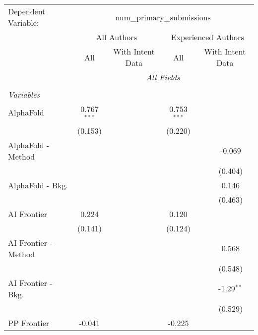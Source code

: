 \begingroup
\centering
\begin{tabular}{lcccccc}
   \tabularnewline \midrule \midrule
   Dependent Variable: & \multicolumn{6}{c}{num\_primary\_submissions}\\
 & \multicolumn{3}{c}{All Authors} & \multicolumn{3}{c}{Experienced Authors} \\
\cmidrule(lr){2-4} \cmidrule(lr){5-7}
 & \multicolumn{1}{c}{All} & \multicolumn{2}{c}{With Intent Data} & \multicolumn{1}{c}{All} & \multicolumn{2}{c}{With Intent Data} \\
\cmidrule(lr){2-2} \cmidrule(lr){3-4} \cmidrule(lr){5-5} \cmidrule(lr){6-7}
 & \multicolumn{6}{c}{\textit{All Fields}} \\ \\
   \emph{Variables}\\
   AlphaFold            & 0.767$^{***}$ &         &         & 0.753$^{***}$ &        &   \\   
                        & (0.153)       &         &         & (0.220)       &        &   \\   
   AlphaFold - Method   &               &         &         &               &        & -0.069\\   
                        &               &         &         &               &        & (0.404)\\   
   AlphaFold - Bkg.     &               &         &         &               &        & 0.146\\   
                        &               &         &         &               &        & (0.463)\\   
   AI Frontier          & 0.224         &         &         & 0.120         &        &   \\   
                        & (0.141)       &         &         & (0.124)       &        &   \\   
   AI Frontier - Method &               &         &         &               &        & 0.568\\   
                        &               &         &         &               &        & (0.548)\\   
   AI Frontier - Bkg.   &               &         &         &               &        & -1.29$^{**}$\\   
                        &               &         &         &               &        & (0.529)\\   
   PP Frontier          & -0.041        &         &         & -0.225        &        &   \\   

\end{tabular}
